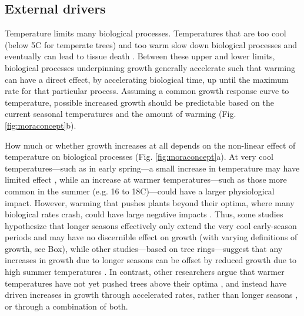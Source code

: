 \documentclass[11pt]{article}
\newcommand{\R}[1]{\label{#1}\linelabel{#1}}
\begin{document}
\subsection*{External drivers}

\R{R2rate1S}Temperature limits many biological processes. Temperatures that are too cool (below 5\degree C for temperate trees) and too warm \citep[an area of active research, but likely between 35-45\degree C;][]{martinez2008hot,cabon2022cross} slow down biological processes and eventually can lead to tissue death \citep[see Fig. \ref{fig:moraconcept}a,][]{larcher1980,kramer2012book}. Between these upper and lower limits, biological processes underpinning growth generally accelerate such that warming can have a direct effect, by accelerating biological time, up until the maximum rate for that particular process. Assuming a common growth response curve to temperature, possible increased growth should be predictable based on the current seasonal temperatures and the amount of warming (Fig. \ref{fig:moraconcept}b). 

How much or whether growth increases at all depends on the non-linear effect of temperature on biological processes (Fig. \ref{fig:moraconcept}a). At very cool temperatures---such as in early spring---a small increase in temperature may have limited effect \citep[or even increase frost risk through early budburst, Fig. \ref{fig:hypotheses}e,][]{cat2021pep}, while an increase at warmer temperatures---such as those more common in the summer (e.g. 16 to 18\degree C)---could have a larger physiological impact. However, warming that pushes plants beyond their optima, where many biological rates crash, could have large negative impacts \citep{nobel1983biophysical,leuning2002temperature}. Thus, some studies hypothesize that longer seasons effectively only extend the very cool early-season periods and may have no discernible effect on growth (with varying definitions of growth, see Box)\R{R1box1}, while other studies---based on tree rings---suggest that any increases in growth due to longer seasons can be offset by reduced growth due to high summer temperatures \citep[Fig. \ref{fig:hypotheses},][]{gantois2022new,dow2022warm}. In contrast, other researchers argue that warmer temperatures have not yet pushed trees above their optima \citep{schaber2002evaluation}, and instead have driven increases in growth through accelerated rates, rather than longer seasons \citep[e.g.][]{ren2019}, or through a combination of both.\R{R2rate1E}
\end{document}
